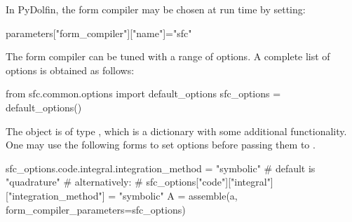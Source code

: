 In PyDolfin, the form compiler may be chosen at run time by setting:  
\begin{python}
  parameters["form_compiler"]["name"]="sfc"
\end{python}
The form compiler can be tuned with a range of options. A complete list of options is obtained as follows:  
\begin{python}
from sfc.common.options import default_options
sfc_options = default_options()
\end{python}
The object  is of type , which is a dictionary with some 
additional functionality. One may use the following forms to set options before passing them to .  
\begin{python}
sfc_options.code.integral.integration_method = "symbolic" # default is "quadrature"  
# alternatively:  
# sfc_options["code"]["integral"]["integration_method"] = "symbolic"  
A = assemble(a, form_compiler_parameters=sfc_options)
\end{python}

